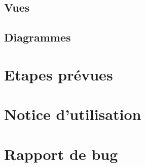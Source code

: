 \documentclass[a4paper]{article}
\begin{document}
\subsection{Vues}

\subsection{Diagrammes}


\section{Etapes pr\'evues}



\section{Notice d'utilisation}


\section{Rapport de bug}

\end{document}
